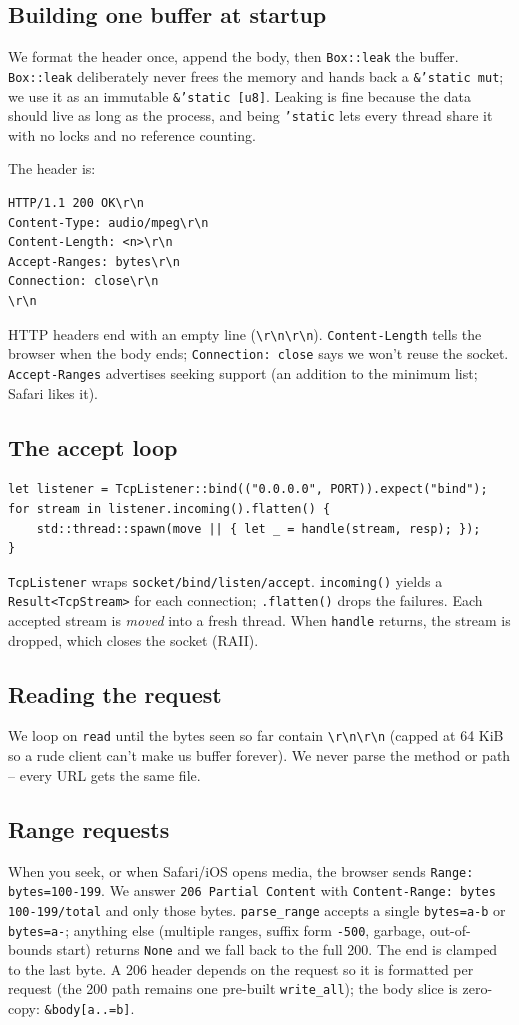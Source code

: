 \documentclass[11pt]{article}
\begin{document}
\subsection{Building one buffer at startup}
We format the header once, append the body, then \texttt{Box::leak} the buffer. \texttt{Box::leak} deliberately never frees the memory and hands back a \texttt{\&'static mut}; we use it as an immutable \texttt{\&'static [u8]}. Leaking is fine because the data should live as long as the process, and being \texttt{'static} lets every thread share it with no locks and no reference counting.

The header is:
\begin{lstlisting}
HTTP/1.1 200 OK\r\n
Content-Type: audio/mpeg\r\n
Content-Length: <n>\r\n
Accept-Ranges: bytes\r\n
Connection: close\r\n
\r\n
\end{lstlisting}
HTTP headers end with an empty line (\verb|\r\n\r\n|). \texttt{Content-Length} tells the browser when the body ends; \texttt{Connection: close} says we won't reuse the socket. \texttt{Accept-Ranges} advertises seeking support (an addition to the minimum list; Safari likes it).

\subsection{The accept loop}
\begin{lstlisting}
let listener = TcpListener::bind(("0.0.0.0", PORT)).expect("bind");
for stream in listener.incoming().flatten() {
    std::thread::spawn(move || { let _ = handle(stream, resp); });
}
\end{lstlisting}
\texttt{TcpListener} wraps \texttt{socket/bind/listen/accept}. \texttt{incoming()} yields a \texttt{Result<TcpStream>} for each connection; \texttt{.flatten()} drops the failures. Each accepted stream is \emph{moved} into a fresh thread. When \texttt{handle} returns, the stream is dropped, which closes the socket (RAII).

\subsection{Reading the request}
We loop on \texttt{read} until the bytes seen so far contain \verb|\r\n\r\n| (capped at 64 KiB so a rude client can't make us buffer forever). We never parse the method or path -- every URL gets the same file.

\subsection{Range requests}
When you seek, or when Safari/iOS opens media, the browser sends \texttt{Range: bytes=100-199}. We answer \texttt{206 Partial Content} with \texttt{Content-Range: bytes 100-199/total} and only those bytes. \texttt{parse\_range} accepts a single \texttt{bytes=a-b} or \texttt{bytes=a-}; anything else (multiple ranges, suffix form \texttt{-500}, garbage, out-of-bounds start) returns \texttt{None} and we fall back to the full 200. The end is clamped to the last byte. A 206 header depends on the request so it is formatted per request (the 200 path remains one pre-built \texttt{write\_all}); the body slice is zero-copy: \texttt{\&body[a..=b]}.
\end{document}
